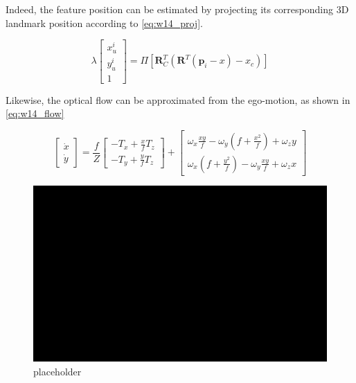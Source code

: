 \documentclass[10pt,twocolumn]{IEEEtran}
\begin{document}
Indeed, the feature position can be estimated by projecting its corresponding 3D landmark position according to \eqref{eq:w14_proj}.

\begin{equation}
    \label{eq:w14_proj}
    \lambda \begin{bmatrix}
        x_u^i\\ 
        y_u^i\\ 
        1
        \end{bmatrix}
        =
        \Pi \left[
        \mathbf{R}_C^T\left(\mathbf{R}^T\left(\mathbf{p}_i-x
         \right ) -x_c
         \right )
         \right ]
\end{equation}

Likewise, the optical flow can be approximated from the ego-motion, as shown in \eqref{eq:w14_flow}

\begin{equation}
    \label{eq:w14_flow}
    \begin{bmatrix}
        \dot{x}\\ 
        \dot{y}
        \end{bmatrix}
        =
        \frac{f}{Z}
        \begin{bmatrix}
            -T_x+\frac{x}{f}T_z\\ 
            -T_y+\frac{y}{f}T_z
            \end{bmatrix}
            +
            \begin{bmatrix}
                \omega_x \frac{xy}{f}-\omega_y\left( f + \frac{x^2}{f}\right) + \omega_z y\\ 
                \omega_x\left( f + \frac{y^2}{f}\right) - \omega_y \frac{xy}{f} + \omega_z x
            \end{bmatrix} 
\end{equation}

\begin{figure}[ht]
    \centering
    \includegraphics[width = 1\linewidth]{placeholder.png}
    \caption[]{placeholder}
    \label{placeholder}
\end{figure}




%
%
\end{document}

